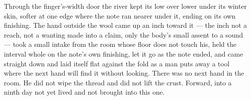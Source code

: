 Through the finger's-width door the river kept its low over lower under its winter skin, softer at one edge where the note ran nearer under it, ending on its own finishing. The hand outside the wool came up an inch toward it --- the inch not a reach, not a wanting made into a claim, only the body's small assent to a sound --- took a small intake from the room whose floor does not touch his, held the interval whole on the note's own finishing, let it go as the note ended, and came straight down and laid itself flat against the fold as a man puts away a tool where the next hand will find it without looking. There was no next hand in the room. He did not wipe the thread and did not lift the crust. Forward, into a ninth day not yet lived and not brought into this one.
